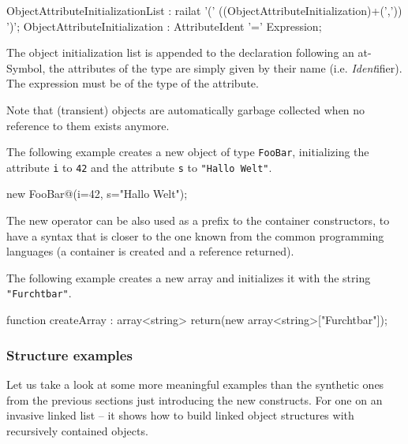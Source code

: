 \begin{rail}
ObjectAttributeInitializationList : railat '(' ((ObjectAttributeInitialization)+(',')) ')';
ObjectAttributeInitialization : AttributeIdent '=' Expression;
\end{rail}

The object initialization list is appended to the declaration following an at-Symbol, the attributes of the type are simply given by their name (i.e. \emph{Ident}ifier).
The expression must be of the type of the attribute.  

Note that (transient) objects are automatically garbage collected when no reference to them exists anymore.

\begin{example}
The following example creates a new object of type \texttt{FooBar}, initializing the attribute \texttt{i} to \texttt{42} and the attribute \texttt{s} to \texttt{"Hallo Welt"}.
\begin{grgen}
new FooBar@(i=42, s="Hallo Welt");
\end{grgen}
\end{example}

The new operator can be also used as a prefix to the container constructors, to have a syntax that is closer to the one known from the common programming languages (a container is created and a reference returned).

\begin{example}
The following example creates a new array and initializes it with the string \texttt{"Furchtbar"}.
\begin{grgen}
function createArray : array<string>
{
  return(new array<string>["Furchtbar"]);
}
\end{grgen}
\end{example}



\subsubsection{Structure examples}

Let us take a look at some more meaningful examples than the synthetic ones from the previous sections just introducing the new constructs.
For one on an invasive linked list -- it shows how to build linked object structures with recursively contained objects.

